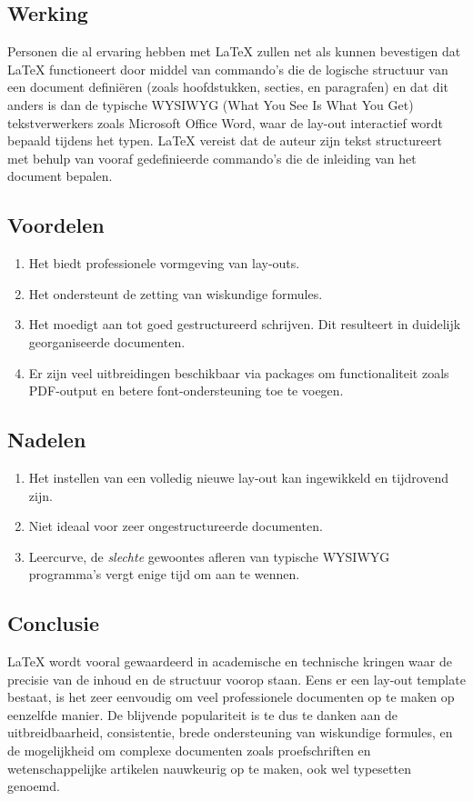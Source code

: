 \subsection{Werking}
Personen die al ervaring hebben met \LaTeX{} zullen net als \textcite{Oetiker2023} kunnen bevestigen dat \LaTeX{} functioneert door middel van commando's die de logische structuur van een document definiëren (zoals hoofdstukken, secties, en paragrafen) en dat dit anders is dan de typische WYSIWYG (What You See Is What You Get) tekstverwerkers zoals Microsoft Office Word, waar de lay-out interactief wordt bepaald tijdens het typen. \LaTeX{} vereist dat de auteur zijn tekst structureert met behulp van vooraf gedefinieerde commando's die de inleiding van het document bepalen. 

\subsection{Voordelen}
\begin{enumerate}
    \item Het biedt professionele vormgeving van lay-outs.
    \item Het ondersteunt de zetting van wiskundige formules.
    \item Het moedigt aan tot goed gestructureerd schrijven. Dit resulteert in duidelijk georganiseerde documenten.
    \item Er zijn veel uitbreidingen beschikbaar via packages om functionaliteit zoals PDF-output en betere font-ondersteuning toe te voegen.
\end{enumerate}

\subsection{Nadelen}
\begin{enumerate}
    \item Het instellen van een volledig nieuwe lay-out kan ingewikkeld en tijdrovend zijn.
    \item Niet ideaal voor zeer ongestructureerde documenten.
    \item Leercurve, de \emph{slechte} gewoontes afleren van typische WYSIWYG programma's vergt enige tijd om aan te wennen.
\end{enumerate}

\subsection{Conclusie}
\LaTeX{} \autocite{Oetiker2023} wordt vooral gewaardeerd in academische en technische kringen waar de precisie van de inhoud en de structuur voorop staan. Eens er een lay-out template bestaat, is het zeer eenvoudig om veel professionele documenten op te maken op eenzelfde manier. 
De blijvende populariteit is te dus te danken aan de uitbreidbaarheid, consistentie, brede ondersteuning van wiskundige formules, en de mogelijkheid om complexe documenten zoals proefschriften en wetenschappelijke artikelen nauwkeurig op te maken, ook wel typesetten genoemd. 
 
